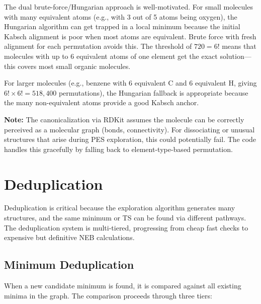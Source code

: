 \documentclass[11pt,a4paper]{article}
\begin{document}
\begin{evaluation}
The dual brute-force/Hungarian approach is well-motivated. For small molecules with many equivalent atoms (e.g.,  with 3 out of 5 atoms being oxygen), the Hungarian algorithm can get trapped in a local minimum because the initial Kabsch alignment is poor when most atoms are equivalent. Brute force with fresh alignment for each permutation avoids this. The threshold of $720 = 6!$ means that molecules with up to 6 equivalent atoms of one element get the exact solution---this covers most small organic molecules.

For larger molecules (e.g., benzene with 6 equivalent C and 6 equivalent H, giving $6! \times 6! = 518{,}400$ permutations), the Hungarian fallback is appropriate because the many non-equivalent atoms provide a good Kabsch anchor.

\textbf{Note:} The canonicalization via RDKit assumes the molecule can be correctly perceived as a molecular graph (bonds, connectivity). For dissociating or unusual structures that arise during PES exploration, this could potentially fail. The code handles this gracefully by falling back to element-type-based permutation.
\end{evaluation}


\section{Deduplication}
\label{sec:dedup}

Deduplication is critical because the exploration algorithm generates many structures, and the same minimum or TS can be found via different pathways. The deduplication system is multi-tiered, progressing from cheap fast checks to expensive but definitive NEB calculations.

\subsection{Minimum Deduplication}

When a new candidate minimum is found, it is compared against all existing minima in the graph. The comparison proceeds through three tiers:
\end{document}
